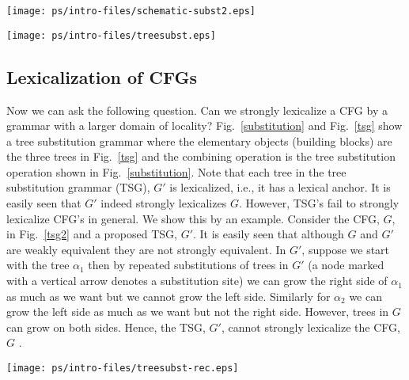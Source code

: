 \begin{figure*}[ht] 
\begin{center}
\texttt{[image: ps/intro-files/schematic-subst2.eps]}
\caption{\label{substitution} Substitution}
\end{center}
\end{figure*}

\begin{figure*}[ht] 
\begin{center}
\texttt{[image: ps/intro-files/treesubst.eps]}
\caption{\label{tsg} Tree substitution grammar}
\end{center}
\end{figure*}

\subsection{Lexicalization of CFGs}

Now we can ask the following question. Can we strongly lexicalize a
CFG by a grammar with a larger domain of locality?
Fig.~\ref{substitution} and Fig.~\ref{tsg} show a tree substitution
grammar where the elementary objects (building blocks) are the three
trees in Fig.~\ref{tsg} and the combining operation is the tree
substitution operation shown in Fig.~\ref{substitution}. Note that
each tree in the tree substitution grammar (TSG), $G'$ is lexicalized,
i.e., it has a lexical anchor. It is easily seen that $G'$ indeed
strongly lexicalizes $G$. However, TSG's fail to strongly lexicalize
CFG's in general. We show this by an example. Consider the CFG, $G$,
in Fig.~\ref{tsg2} and a proposed TSG, $G'$. It is easily seen that
although $G$ and $G'$ are weakly equivalent they are not strongly
equivalent. In $G'$, suppose we start with the tree $\alpha_1$ then by
repeated substitutions of trees in $G'$ (a node marked with a vertical
arrow denotes a substitution site) we can grow the right side of
$\alpha_1$ as much as we want but we cannot grow the left
side. Similarly for $\alpha_2$ we can grow the left side as much as we
want but not the right side. However, trees in $G$ can grow on both
sides. Hence, the TSG, $G'$, cannot strongly lexicalize the CFG, $G$
\cite{joshischabes96}.


\begin{figure*}[ht] 
\begin{center}
\texttt{[image: ps/intro-files/treesubst-rec.eps]}
\caption{\label{tsg2} A tree substitution grammar}
\end{center}
\end{figure*}


